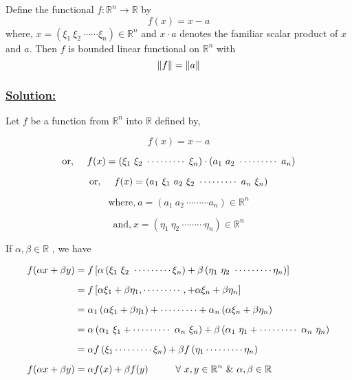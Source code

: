 \documentclass[a4paper,12pt]{article}
\begin{document}
    \begin{tcolorbox}[title=Problem]
        Define the functional $f : \mathbb{R}^{n}\to \mathbb{R}$ by 
        \[f(x) = x - a\]
        where, $x = \left(\xi_1\ \xi_2\ \cdots \cdots\xi_n\right)\in \mathbb{R}^n$ and $x\cdot a$ denotes the familiar scalar product of $x$ and $a$. Then $f$ is bounded linear functional on $\mathbb{R}^n$ with
        \[\norm{f} = \norm{a}\]
    \end{tcolorbox}

    \subsubsection*{\underline{{\bf Solution:}}}

    Let $f$ be a function from $\mathbb{R}^n$ into $\mathbb{R}$ defined by,

    \[f(x) = x-a\]

    \[\mbox{or,}\hspace*{0.5cm} f(x) = \left(\xi_1\ \xi_2\ \cdots \cdots \cdots \ \xi_n\right)\cdot \left(a_1\ a_2\ \cdots \cdots  \cdots\ a_n\right)\]

    \[\mbox{or,}\hspace*{0.5cm} f(x) = \left(a_1\ \xi_1\ a_2\ \xi_2\ \cdots \cdots \cdots \ a_n\ \xi_n\right)\]

    \[\mbox{where,}\ a = \left(a_1\ a_2 \ \cdots \cdots \cdots a_n\right)\in \mathbb{R}^n\]

    \[\mbox{and,}\ x = \left(\eta_1\ \eta_2 \ \cdots \cdots \cdots \eta_n\right)\in \mathbb{R}^n\]

    If $\alpha, \beta \in \mathbb{R}$ , we have

    \begin{equation*}
        \begin{split}
            f(\alpha x + \beta y) & = f\left[\alpha\left(\xi_1\ \xi_2 \ \cdots \cdots \cdots \xi_n\right) + \beta\left(\eta_1\ \eta_2 \ \cdots \cdots \cdots \eta_n\right) \right]\\[2mm]
            & = f\left[\alpha \xi_1 + \beta \eta_1,\cdots \cdots \cdots,  + \alpha \xi_n + \beta \eta_n\right]\\[2mm]
            & = \alpha_1\left(\alpha \xi_1 + \beta \eta_1\right) + \cdots \cdots \cdots  + \alpha_n\left(\alpha \xi_n + \beta \eta_n\right)\\[2mm]
            & = \alpha \left(\alpha_1 \ \xi_1 + \cdots \cdots \cdots\ \alpha_n\ \xi_n\right) + \beta\left(\alpha_1 \ \eta_1 + \cdots \cdots \cdots\ \alpha_n\ \eta_n\right)\\[2mm]
            & = \alpha f \left(\xi_1 \cdots \cdots \cdots \xi_n\right) + \beta f \left(\eta_1 \cdots \cdots \cdots \eta_n\right)\\[2mm]
            f(\alpha x + \beta y) & = \alpha f(x) + \beta f(y) \hspace*{1cm} \forall\ x,y\in \mathbb{R}^n\  \&\  \alpha, \beta\in \mathbb{R}
        \end{split}
    \end{equation*}
\end{document}
